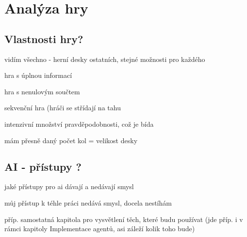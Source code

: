 \chapter{Analýza hry}

\section{Vlastnosti hry?}
vidím všechno - herní desky ostatních, stejné možnosti pro každého

hra s úplnou informací

hra s nenulovým součtem

sekvenční hra (hráči se střídají na tahu

intenzivní množství pravděpodobnosti, což je bída

mám přesně daný počet kol = velikost desky


\section{AI - přístupy ?}
jaké přístupy pro ai dávají a nedávají smysl

můj přístup k téhle práci nedává smysl, docela nestíhám

příp. samostatná kapitola pro vysvětlení těch, které budu používat (jde příp. i v rámci kapitoly Implementace agentů, asi záleží kolik toho bude)

